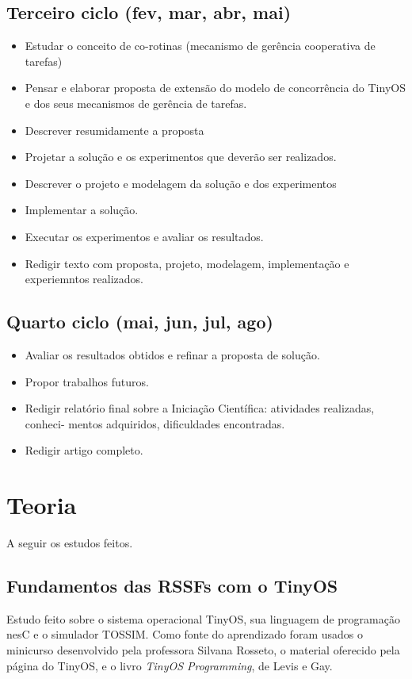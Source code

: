 \documentclass[a4paper,onecolumn, 10pt]{article}
\begin{document}
\subsection{Terceiro ciclo (fev, mar, abr, mai)}
\begin{itemize}
  \item Estudar o conceito de co-rotinas (mecanismo de gerência cooperativa de tarefas)
  \item Pensar e elaborar proposta de extensão do modelo de concorrência do TinyOS e
  dos seus mecanismos de gerência de tarefas.
  \item Descrever resumidamente a proposta
  \item Projetar a solução e os experimentos que deverão ser realizados.
  \item Descrever o projeto e modelagem da solução e dos experimentos
  \item Implementar a solução.
  \item Executar os experimentos e avaliar os resultados.
  \item Redigir texto com proposta, projeto, modelagem, implementação e experiemntos
  realizados.
\end{itemize}

\subsection{Quarto ciclo (mai, jun, jul, ago)}
\begin{itemize}
  \item Avaliar os resultados obtidos e refinar a proposta de solução.
  \item Propor trabalhos futuros.
  \item Redigir relatório final sobre a Iniciação Científica: atividades realizadas, conheci-
  mentos adquiridos, dificuldades encontradas.
  \item Redigir artigo completo.
\end{itemize}

\pagebreak

\section{Teoria}\label{teoria}
A seguir os estudos feitos.

\subsection{Fundamentos das RSSFs com o TinyOS}
Estudo feito sobre o sistema operacional TinyOS, sua linguagem de programação nesC e o simulador TOSSIM.
Como fonte do aprendizado foram usados o minicurso desenvolvido pela professora Silvana Rosseto\cite{minicurso}, o material oferecido
pela página do TinyOS\cite{siteTinyOS}, e o livro \textit{TinyOS Programming}, de Levis e Gay\cite{tinyosprogramming}.
\end{document}
